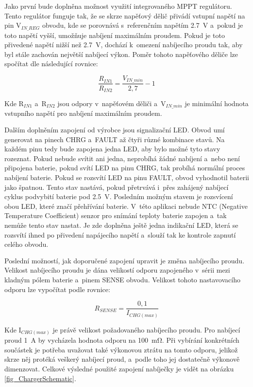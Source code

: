 Jako první bude doplněna možnost využití integrovaného MPPT regulátoru. Tento regulátor funguje tak, že se skrze napěťový dělič přivádí vstupní napětí na pin V$_{IN\_REG}$ obvodu, kde se porovnává s~referenčním napětím \SI{2.7}{\volt} a~pokud je toto napětí vyšší, umožňuje nabíjení maximálním proudem. Pokud je toto přivedené napětí nižší než \SI{2.7}{\volt}, dochází k~omezení nabíjecího proudu tak, aby byl stále zachován největší nabíjecí výkon. Poměr tohoto napěťového děliče lze spočítat dle následující rovnice:

\begin{equation}
    \frac{R_{IN1}}{R_{IN2}} = \frac{V_{IN\_min}}{2,7} - 1
    \label{eq_MPPTRegulator}
\end{equation}

Kde R$_{IN1}$ a~R$_{IN2}$ jsou odpory v~napěťovém děliči a~V$_{IN\_min}$ je minimální hodnota vstupního napětí pro nabíjení maximálním proudem.

Dalším doplněním zapojení od výrobce jsou signalizační LED. Obvod umí generovat na pinech CHRG a~FAULT až čtyři různé kombinace stavů. Na každém pinu tedy bude zapojena jedna LED, aby bylo možné tyto stavy rozeznat. Pokud nebude svítit ani jedna, neprobíhá žádné nabíjení a~nebo není připojena baterie, pokud svítí LED na pinu CHRG, tak probíhá normální proces nabíjení baterie. Pokud se rozsvítí LED na pinu FAULT, obvod vyhodnotil baterii jako špatnou. Tento stav nastává, pokud přetrvává i~přes zahájený nabíjecí cyklus podvybití baterie pod \SI{2.5}{\volt}. Posledním možným stavem je rozsvícení obou LED, které značí přehřívání baterie. V~této aplikaci nebude NTC (Negative Temperature Coefficient) senzor pro snímání teploty baterie zapojen a~tak nemůže tento stav nastat. Je zde doplněna ještě jedna indikační LED, která se rozsvítí ihned po přivedení napájecího napětí a~slouží tak ke kontrole zapnutí celého obvodu.

Poslední možností, jak doporučené zapojení upravit je změna nabíjecího proudu. Velikost nabíjecího proudu je dána velikostí odporu zapojeného v~sérii mezi kladným pólem baterie a~pinem SENSE obvodu. Velikost tohoto nastavovacího odporu lze vypočítat podle rovnice:

\begin{equation}
    R_{SENSE} = \frac{0,1}{I_{CHG(max)}}
    \label{eq_RsenseCharger}
\end{equation}

Kde I$_{CHG(max)}$ je právě velikost požadovaného nabíjecího proudu. Pro nabíjecí proud \SI{1}{\ampere} by vycházela hodnota odporu na \SI{100}{\milli\ohm}. Při vybírání konkrétních součástek je potřeba uvažovat také výkonovou ztrátu na tomto odporu, jelikož skrze něj protéká veškerý nabíjecí proud, a~podle toho jej dostatečně výkonově dimenzovat. Celkové výsledné použité zapojení nabíječky je vidět na obrázku \ref{fig_ChargerSchematic}.

